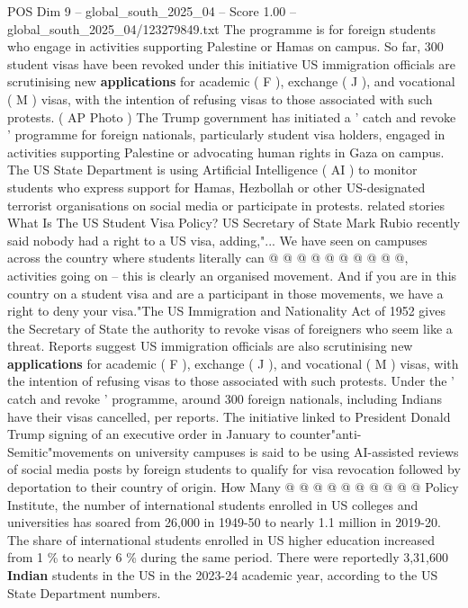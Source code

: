 \begin{textsample}{POS Dim 9 – global\_south\_2025\_04 – Score 1.00 – global\_south\_2025\_04/123279849.txt}  \label{ex:f9_pos_149}
The programme is for foreign students who engage in activities supporting Palestine or Hamas on campus.
So far, 300 student visas have been revoked under this initiative US immigration officials are scrutinising new \textbf{applications} for academic ( F ), exchange ( J ), and vocational ( M ) visas, with the intention of refusing visas to those associated with such protests. ( AP Photo ) The Trump government has initiated a ' catch and revoke ' programme for foreign nationals, particularly student visa holders, engaged in activities supporting Palestine or advocating human rights in Gaza on campus.
The US State Department is using Artificial Intelligence ( AI ) to monitor students who express support for Hamas, Hezbollah or other US-designated terrorist organisations on social media or participate in protests. related stories What Is The US Student Visa Policy?
US Secretary of State Mark Rubio recently said nobody had a right to a US visa, adding,"...
We have seen on campuses across the country where students literally can @ @ @ @ @ @ @ @ @ @, activities going on -- this is clearly an organised movement.
And if you are in this country on a student visa and are a participant in those movements, we have a right to deny your visa."The US Immigration and Nationality Act of 1952 gives the Secretary of State the authority to revoke visas of foreigners who seem like a threat.
Reports suggest US immigration officials are also scrutinising new \textbf{applications} for academic ( F ), exchange ( J ), and vocational ( M ) visas, with the intention of refusing visas to those associated with such protests.
Under the ' catch and revoke ' programme, around 300 foreign nationals, including Indians have their visas cancelled, per reports.
The initiative linked to President Donald Trump signing of an executive order in January to counter"anti-Semitic"movements on university campuses is said to be using AI-assisted reviews of social media posts by foreign students to qualify for visa revocation followed by deportation to their country of origin.
How Many @ @ @ @ @ @ @ @ @ @ Policy Institute, the number of international students enrolled in US colleges and universities has soared from 26,000 in 1949-50 to nearly 1.1 million in 2019-20.
The share of international students enrolled in US higher education increased from 1 \% to nearly 6 \% during the same period.
There were reportedly 3,31,600 \textbf{Indian} students in the US in the 2023-24 academic year, according to the US State Department numbers.

\end{textsample}
